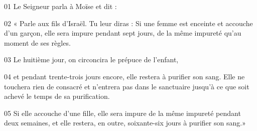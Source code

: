 01 Le Seigneur parla à Moïse et dit :

02 « Parle aux fils d’Israël. Tu leur diras : Si une femme est enceinte et accouche d’un garçon, elle sera impure pendant sept jours, de la même impureté qu’au moment de ses règles.

03 Le huitième jour, on circoncira le prépuce de l’enfant,

04 et pendant trente-trois jours encore, elle restera à purifier son sang. Elle ne touchera rien de consacré et n’entrera pas dans le sanctuaire jusqu’à ce que soit achevé le temps de sa purification.

05 Si elle accouche d’une fille, elle sera impure de la même impureté pendant deux semaines, et elle restera, en outre, soixante-six jours à purifier son sang.»
